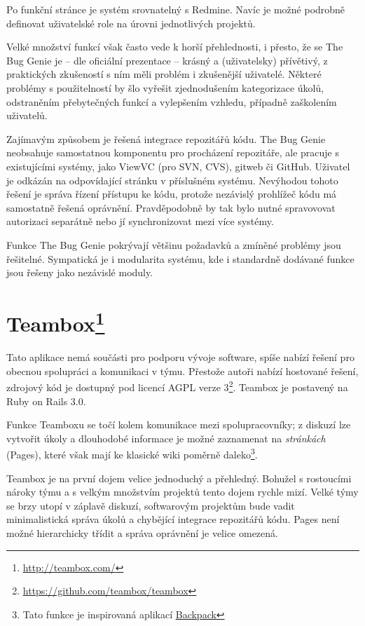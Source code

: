 \documentclass[thesis=B,czech]{FITthesis}[2012/05/02]
\begin{document}
Po funkční stránce je systém srovnatelný s Redmine. Navíc je možné
podrobně definovat uživatelské role na úrovni jednotlivých projektů.

Velké množství funkcí však často vede k horší přehlednosti, i přesto, že
se The Bug Genie je -- dle oficiální prezentace -- krásný a
(uživatelsky) přívětivý, z praktických zkušeností s ním měli problém i
zkušenější uživatelé. Některé problémy s použitelností by šlo vyřešit
zjednodušením kategorizace úkolů, odstraněním přebytečných funkcí a
vylepšením vzhledu, případně zaškolením uživatelů.

Zajímavým způsobem je řešená integrace repozitářů kódu. The Bug Genie
neobsahuje samostatnou komponentu pro procházení repozitáře, ale pracuje
s existujícími systémy, jako ViewVC (pro SVN, CVS), gitweb či GitHub.
Uživatel je odkázán na odpovídající stránku v příslušném systému.
Nevýhodou tohoto řešení je správa řízení přístupu ke kódu, protože
nezávislý prohlížeč kódu má samostatně řešená oprávnění. Pravděpodobně
by tak bylo nutné spravovovat autorizaci separátně nebo jí
synchronizovat mezi více systémy.

Funkce The Bug Genie pokrývají většinu požadavků a zmíněné problémy jsou
řešitelné. Sympatická je i modularita systému, kde i standardně dodávané
funkce jsou řešeny jako nezávislé moduly.

\section[Teambox]{Teambox\footnote{\url{http://teambox.com/}}}

Tato aplikace nemá součásti pro podporu vývoje software, spíše nabízí
řešení pro obecnou spolupráci a komunikaci v týmu. Přestože autoři
nabízí hostované řešení, zdrojový kód je dostupný pod licencí \gls{AGPL}
verze 3\footnote{\url{https://github.com/teambox/teambox}}. Teambox je
postavený na Ruby on Rails 3.0.

Funkce Teamboxu se točí kolem komunikace mezi spolupracovníky; z diskuzí
lze vytvořit úkoly a dlouhodobé informace je možné zaznamenat na
\emph{stránkách} (Pages), které však mají ke klasické wiki poměrně
daleko\footnote{Tato funkce je inspirovaná aplikací
  \href{http://backpackit.com/}{Backpack}}.

Teambox je na první dojem velice jednoduchý a přehledný. Bohužel s
rostoucími nároky týmu a s velkým množstvím projektů tento dojem rychle
mizí. Velké týmy se brzy utopí v záplavě diskuzí, softwarovým projektům
bude vadit minimalistická správa úkolů a chybějící integrace repozitářů
kódu. Pages není možné hierarchicky třídit a správa oprávnění je velice
omezená.
\end{document}
